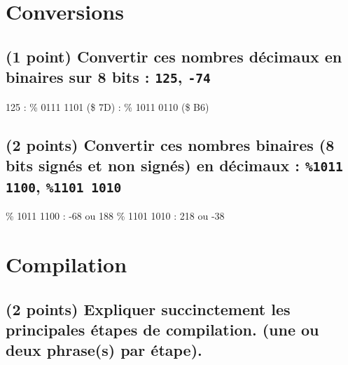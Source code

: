 \documentclass[11pt,a4paper]{article}
\author{Fabrice BOISSIER}
\begin{document}
\setlength{\fboxrule}{2pt}

\noindent {}



%


\section{Conversions} %

\subsection{(1 point) Convertir ces nombres décimaux en binaires sur 8 bits : \texttt{125}, \texttt{-74}}

\bigskip

125 : \% 0111 1101 (\$ 7D)	 : \% 1011 0110 (\$ B6)

\bigskip

\subsection{(2 points) Convertir ces nombres binaires (8 bits signés et non signés) en décimaux : \texttt{\%1011 1100}, \texttt{\%1101 1010}}

\bigskip
\% 1011 1100 : -68 ou 188	\qquad	\% 1101 1010 : 218 ou -38
\bigskip

\section{Compilation} %

\subsection{(2 points) Expliquer succinctement les principales étapes de compilation. (une ou deux phrase(s) par étape).}
\end{document}
